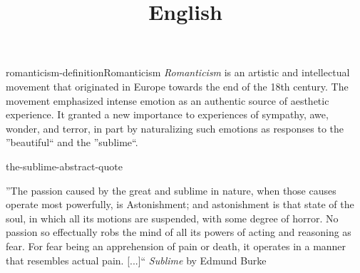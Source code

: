 \documentclass[preview]{standalone}
\begin{document}
\title{English}
\genpage

\begin{snippetdefinition}{romanticism-definition}{Romanticism}
    \textit{Romanticism} is an artistic and intellectual movement that originated
    in Europe towards the end of the 18th century.
    The movement emphasized intense emotion as an authentic source of aesthetic experience.
    It granted a new importance to experiences of sympathy, awe, wonder, and terror,
    in part by naturalizing such emotions as responses to the ''beautiful`` and the ''sublime``.
\end{snippetdefinition}


\begin{snippet}{the-sublime-abstract-quote}
\begin{displayquote}
''The passion caused by the great and sublime in nature, when those causes operate most powerfully, is Astonishment; and astonishment is that state of the soul, in which all its motions are suspended, with some degree of horror. No passion so effectually robs the mind of all its powers of acting and reasoning as fear. For fear being an apprehension of pain or death, it operates in a manner that resembles actual pain. [...]``
\textit{Sublime} by Edmund Burke
\end{displayquote}
\end{snippet}
\end{document}
